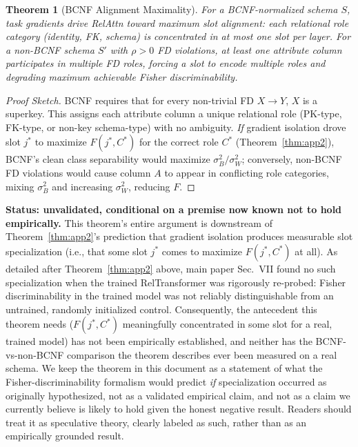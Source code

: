 \documentclass[conference]{IEEEtran}
\newtheorem{theorem}{Theorem}
\begin{document}
\begin{theorem}[BCNF Alignment Maximality]
\label{thm:app4}
For a BCNF-normalized schema $S$, task gradients drive RelAttn toward maximum slot alignment: each relational role category (identity, FK, schema) is concentrated in at most one slot per layer. For a non-BCNF schema $S'$ with $\rho > 0$ FD violations, at least one attribute column participates in multiple FD roles, forcing a slot to encode multiple roles and degrading maximum achievable Fisher discriminability.
\end{theorem}
\begin{proof}[Proof Sketch]
	\renewcommand{\qedsymbol}{}
BCNF requires that for every non-trivial FD $X \to Y$, $X$ is a superkey. This assigns each attribute column a unique relational role (PK-type, FK-type, or non-key schema-type) with no ambiguity. \emph{If} gradient isolation drove slot $j^*$ to maximize $F(j^*, C^*)$ for the correct role $C^*$ (Theorem~\ref{thm:app2}), BCNF's clean class separability would maximize $\sigma_B^2/\sigma_W^2$; conversely, non-BCNF FD violations would cause column $A$ to appear in conflicting role categories, mixing $\sigma_B^2$ and increasing $\sigma_W^2$, reducing $F$.
\end{proof}

\textbf{Status: unvalidated, conditional on a premise now known not to hold empirically.} This theorem's entire argument is downstream of Theorem~\ref{thm:app2}'s prediction that gradient isolation produces measurable slot specialization (i.e., that some slot $j^*$ comes to maximize $F(j^*,C^*)$ at all). As detailed after Theorem~\ref{thm:app2} above, main paper Sec.~VII found no such specialization when the trained RelTransformer was rigorously re-probed: Fisher discriminability in the trained model was not reliably distinguishable from an untrained, randomly initialized control. Consequently, the antecedent this theorem needs ($F(j^*,C^*)$ meaningfully concentrated in some slot for a real, trained model) has not been empirically established, and neither has the BCNF-vs-non-BCNF comparison the theorem describes ever been measured on a real schema. We keep the theorem in this document as a statement of what the Fisher-discriminability formalism would predict \emph{if} specialization occurred as originally hypothesized, not as a validated empirical claim, and not as a claim we currently believe is likely to hold given the honest negative result. Readers should treat it as speculative theory, clearly labeled as such, rather than as an empirically grounded result.
\end{document}
